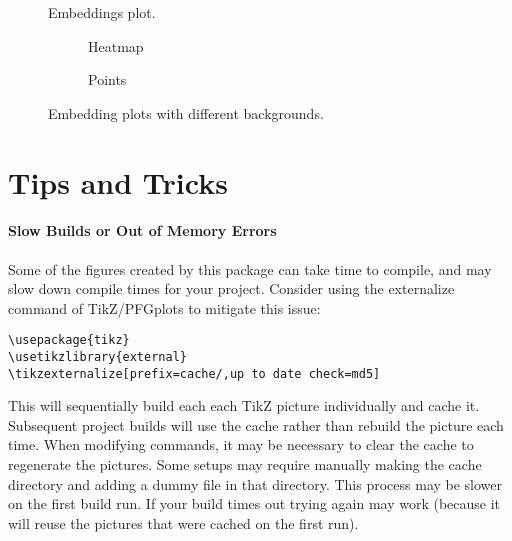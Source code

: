 \documentclass[10pt]{article}
\begin{document}
\begin{figure}[t]
    \caption{Embeddings plot.}
\end{figure}

\begin{figure}
    \centering
    \begin{subfigure}[t]{0.49\linewidth}
        \embedding[matrix=doc_data/embedding/heatmap.dat,no axes labels,no tick labels,no best-response names]
        \caption{Heatmap}
    \end{subfigure}\hfill
    \begin{subfigure}[t]{0.49\linewidth}
        \embedding[points=doc_data/embedding/points.dat,no axes labels,no tick labels,no best-response names]
        \caption{Points}
    \end{subfigure}

    \caption{Embedding plots with different backgrounds.}
    \label{fig:my_label}
\end{figure}


\section{Tips and Tricks}

\paragraph{Slow Builds or Out of Memory Errors}

Some of the figures created by this package can take time to compile, and may slow down compile times for your project. Consider using the externalize command of TikZ/PFGplots to mitigate this issue:

\begin{verbatim}
\usepackage{tikz}
\usetikzlibrary{external}
\tikzexternalize[prefix=cache/,up to date check=md5]
\end{verbatim}

This will sequentially build each each TikZ picture individually and cache it. Subsequent project builds will use the cache rather than rebuild the picture each time. When modifying commands, it may be necessary to clear the cache to regenerate the pictures. Some setups may require manually making the cache directory and adding a dummy file in that directory. This process may be slower on the first build run. If your build times out trying again may work (because it will reuse the pictures that were cached on the first run).
\end{document}
